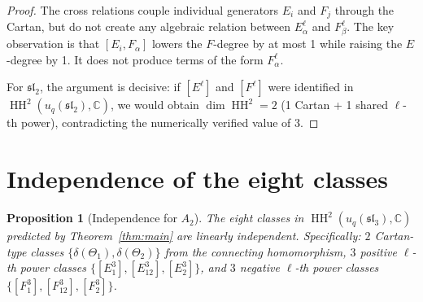 \documentclass[11pt,letterpaper]{amsart}
\theoremstyle{plain}
\newtheorem{proposition}[theorem]{Proposition}
\theoremstyle{definition}
\theoremstyle{remark}
\newcommand{\HH}{\operatorname{HH}}
\newcommand{\CC}{\mathbb{C}}
\begin{document}
\begin{proof}
The cross relations couple individual generators $E_i$ and $F_j$ through the Cartan, but do not create any algebraic relation between $E_\alpha^\ell$ and $F_\beta^\ell$. The key observation is that $[E_i, F_\alpha]$ lowers the $F$-degree by at most 1 while raising the $E$-degree by 1. It does not produce terms of the form $F_\alpha^\ell$.

For $\mathfrak{sl}_2$, the argument is decisive: if $[E^\ell]$ and $[F^\ell]$ were identified in $\HH^2(u_q(\mathfrak{sl}_2), \CC)$, we would obtain $\dim \HH^2 = 2$ (1 Cartan + 1 shared $\ell$-th power), contradicting the numerically verified value of 3.
\end{proof}

\section{Independence of the eight classes}
\label{sec:independence}
\begin{proposition}[Independence for $A_2$]
\label{thm:independence}
The eight classes in $\HH^2(u_q(\mathfrak{sl}_3), \CC)$ predicted by Theorem~\ref{thm:main} are linearly independent. Specifically: $2$ Cartan-type classes $\{\delta(\Theta_1), \delta(\Theta_2)\}$ from the connecting homomorphism, $3$ positive $\ell$-th power classes $\{[E_1^3], [E_{12}^3], [E_2^3]\}$, and $3$ negative $\ell$-th power classes $\{[F_1^3], [F_{12}^3], [F_2^3]\}$.
\end{proposition}
\end{document}
